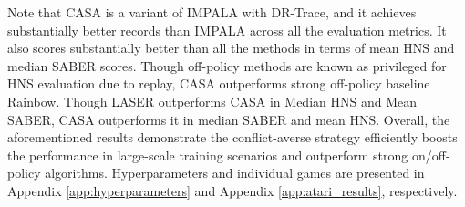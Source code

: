 \begin{table}[h!]
    \centering
    \vskip -0.05in
    \caption{Evaluation scores for the methods on Atari benchmark presented in $\%$. 
    }
    \label{tab:atari_results}
\end{table}

Note that CASA is a variant of IMPALA with DR-Trace, and it achieves substantially better records than IMPALA across all the evaluation metrics. It also scores substantially better than all the methods in terms of mean HNS and median SABER scores. Though off-policy methods are known as  privileged for HNS evaluation due to replay, CASA outperforms strong off-policy baseline Rainbow. Though LASER outperforms CASA in Median HNS and Mean SABER, CASA outperforms it in median SABER and mean HNS. 
Overall, the aforementioned results demonstrate the conflict-averse strategy efficiently boosts the performance in large-scale training scenarios and outperform strong on/off-policy algorithms. Hyperparameters and individual games are presented in Appendix \ref{app:hyperparameters} and Appendix \ref{app:atari_results}, respectively.



